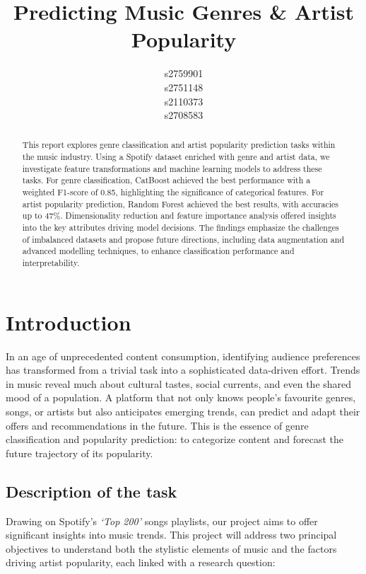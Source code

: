 \documentclass{article}
\title{Predicting Music Genres \& Artist Popularity}
\author{
  s2759901\\
  \And
  s2751148\\
 \And
  s2110373\\
  \And
  s2708583\\
}
\begin{document}
\maketitle

\begin{abstract}
 This report explores genre classification and artist popularity prediction tasks within the music industry. Using a Spotify dataset enriched with genre and artist data, we investigate feature transformations and machine learning models to address these tasks. For genre classification, CatBoost achieved the best performance with a weighted F1-score of 0.85, highlighting the significance of categorical features. For artist popularity prediction, Random Forest achieved the best results, with accuracies up to 47\%. Dimensionality reduction and feature importance analysis offered insights into the key attributes driving model decisions. The findings emphasize the challenges of imbalanced datasets and propose future directions, including data augmentation and advanced modelling techniques, to enhance classification performance and interpretability.

\end{abstract}

\section{Introduction}

In an age of unprecedented content consumption, identifying audience preferences has transformed from a trivial task into a sophisticated data-driven effort. Trends in music reveal much about cultural tastes, social currents, and even the shared mood of a population. A platform that not only knows people's favourite genres, songs, or artists but also anticipates emerging trends, can predict and adapt their offers and recommendations in the future. This is the essence of genre classification and popularity prediction: to categorize content and forecast the future trajectory of its popularity.

\subsection{Description of the task}

Drawing on Spotify's \textit{`Top 200'} songs playlists, our project aims to offer significant insights into music trends. This project will address two principal objectives to understand both the stylistic elements of
music and the factors driving artist popularity, each linked with a research question:
\end{document}
